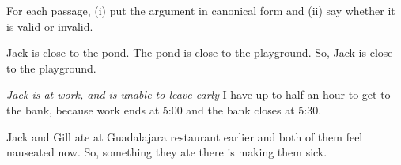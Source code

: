 \noindent\problempart For each passage, (i) put the argument in canonical form and (ii) say whether it is valid or invalid.

\begin{exercises}
\item Jack is close to the pond. The pond is close to the playground. So, Jack is close to the playground.

\item \textit{Jack is at work, and is unable to leave early} I have up to half an hour to get to the bank, because work ends at 5:00 and the bank closes at 5:30.

\item Jack and Gill ate at Guadalajara restaurant earlier and both of them feel nauseated now. So, something they ate there is making them sick.


\end{exercises}
